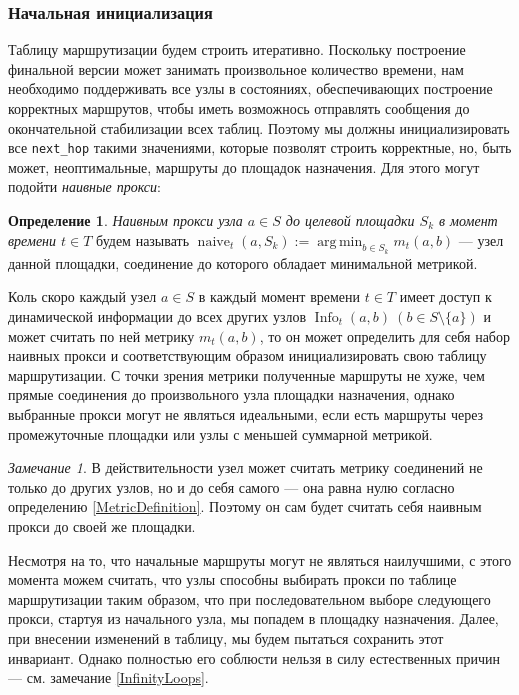 \documentclass{article}
\theoremstyle{plain}
\theoremstyle{plain}
\theoremstyle{plain}
\theoremstyle{plain}
\theoremstyle{definition}
\newtheorem{definition}{Определение}[section]
\theoremstyle{remark}
\newtheorem{remark}{Замечание}[section]
\theoremstyle{plain}
\DeclareMathOperator*{\argmin}{arg\,min}
\DeclareMathOperator*{\info}{Info}
\DeclareMathOperator*{\naive}{naive}
\begin{document}
\subsubsection{Начальная инициализация}
\label{RT_Initialization}

Таблицу маршрутизации будем строить итеративно. Поскольку построение финальной версии может занимать произвольное количество времени, нам необходимо поддерживать все узлы в состояниях, обеспечивающих построение корректных маршрутов, чтобы иметь возможнось отправлять сообщения до окончательной стабилизации всех таблиц. Поэтому мы должны инициализировать все \texttt{next\_hop} такими значениями, которые позволят строить корректные, но, быть может, неоптимальные, маршруты до площадок назначения. Для этого могут подойти \textit{наивные прокси}:

\begin{definition}
    \textit{Наивным прокси узла $a \in S$ до целевой площадки $S_k$ в момент времени $t \in T$} будем называть $\naive_t(a, S_k) := \displaystyle \argmin_{b \in S_k} m_t(a, b)$ --- узел данной площадки, соединение до которого обладает минимальной метрикой.
\end{definition}

Коль скоро каждый узел $a \in S$ в каждый момент времени $t \in T$ имеет доступ к динамической информации до всех других узлов $\info_t(a, b)\ (b \in S \setminus \{a\})$ и может считать по ней метрику $m_t(a, b)$, то он может определить для себя набор наивных прокси и соответствующим образом инициализировать свою таблицу маршрутизации. С точки зрения метрики полученные маршруты не хуже, чем прямые соединения до произвольного узла площадки назначения, однако выбранные прокси могут не являться идеальными, если есть маршруты через промежуточные площадки или узлы с меньшей суммарной метрикой.

\begin{remark}
\label{SelfRouting}
    В действительности узел может считать метрику соединений не только до других узлов, но и до себя самого --- она равна нулю согласно определению \ref{MetricDefinition}. Поэтому он сам будет считать себя наивным прокси до своей же площадки.
\end{remark}

Несмотря на то, что начальные маршруты могут не являться наилучшими, с этого момента можем считать, что узлы способны выбирать прокси по таблице маршрутизации таким образом, что при последовательном выборе следующего прокси, стартуя из начального узла, мы попадем в площадку назначения. Далее, при внесении изменений в таблицу, мы будем пытаться сохранить этот инвариант. Однако полностью его соблюсти нельзя в силу естественных причин --- см. замечание \ref{InfinityLoops}.
\end{document}
